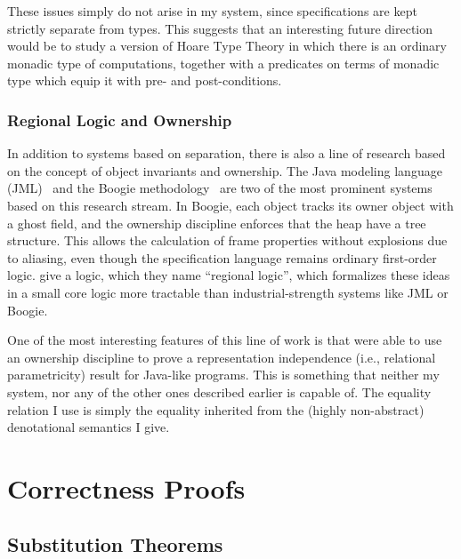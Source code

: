 These issues simply do not arise in my system, since specifications
are kept strictly separate from types. This suggests that an
interesting future direction would be to study a version of Hoare Type
Theory in which there is an ordinary monadic type of computations,
together with a predicates on terms of monadic type which equip it
with pre- and post-conditions.

\subsubsection{Regional Logic and Ownership}

In addition to systems based on separation, there is also a line of
research based on the concept of object invariants and ownership.  The
Java modeling language (JML)~\cite{jml} and the Boogie
methodology~\cite{boogie} are two of the most prominent systems based
on this research stream. In Boogie, each object tracks its owner
object with a ghost field, and the ownership discipline enforces that
the heap have a tree structure. This allows the calculation of frame
properties without explosions due to aliasing, even though the
specification language remains ordinary first-order
logic. \citet{banerjee-naumann-regions} give a logic, which they name
``regional logic'', which formalizes these ideas in a small core logic
more tractable than industrial-strength systems like JML or Boogie.

One of the most interesting features of this line of work is that
\citet{banerjee-naumann-rep} were able to use an ownership discipline to
prove a representation independence (i.e., relational parametricity)
result for Java-like programs.  This is something that neither my
system, nor any of the other ones described earlier is capable of.
The equality relation I use is simply the equality inherited from the
(highly non-abstract) denotational semantics I give.



\section{Correctness Proofs}

\subsection{Substitution Theorems}

